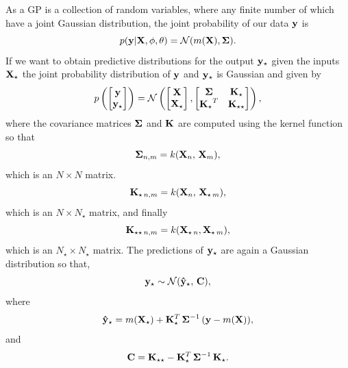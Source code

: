 As a GP is a collection of random variables, where any finite number of which have a joint Gaussian distribution, the joint probability of our data $\bf y$ is
\begin{equation}
p({\bf y} | {\bf X, \phi, \theta}) = \mathcal{N}(m({\bf X}), {\bf \Sigma}).
\end{equation}
If we want to obtain predictive distributions for the output $\bf y_{\star}$ given the inputs $\bf X_{\star}$ the joint probability distribution of $\bf y$ and $\bf y_{\star}$ is Gaussian and given by
\begin{equation}
p \left( \begin{bmatrix} {\bf y} \\ {\bf y_{\star}} \end{bmatrix} \right) = \mathcal{N} \left( \begin{bmatrix} {\bf X} \\ {\bf X_{\star}} \end{bmatrix} , \begin{bmatrix} {\bf \Sigma} & {\bf K_{\star} }\\ {\bf K_{\star}}^{T} & {\bf K_{\star \star}} \end{bmatrix}  \right), 
\end{equation}
where the covariance matrices $\bf \Sigma$ and $\bf K$ are computed using the kernel function so that
\begin{equation}
{\bf \Sigma}_{n, m} = k({\bf X}_{n}, \, {\bf X}_{m}),
\end{equation}
which is an $N \times N$ matrix.
\begin{equation}
{\bf K}_{\star \, n, m} = k({\bf X}_{n}, \, { \bf X}_{\star \, m}),
\end{equation}
which is an $N \times N_{\star}$ matrix, and finally
\begin{equation}
{\bf K}_{\star \star \, n, m} = k({\bf X}_{\star \, n},  {\bf X}_{\star \,m}),
\end{equation}
which is an $N_{\star} \times N_{\star}$ matrix.
The predictions of $\bf y_{\star}$ are again a Gaussian distribution so that,
\begin{equation}
{\bf y}_{\star} \sim \mathcal{N}(\bf \hat{y}_{\star}, \, \bf C),
\label{eq:pred}
\end{equation}
where 
\begin{equation}
{\bf \hat{y}}_{\star} = m({\bf X}_{\star}) + {\bf K}_{\star}^{T} \, {\bf \Sigma}^{-1} \, ({\bf y} - m(\bf X)),
\end{equation}
and 
\begin{equation}
{\bf C} = {\bf K}_{\star \star} - {\bf K}_{\star}^{T} \, {\bf \Sigma}^{-1} \, {\bf K_{\star}}.
\end{equation}

